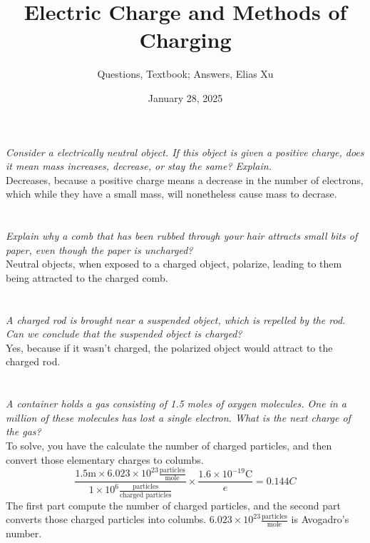 \documentclass{article}
\begin{document}
\title{Electric Charge and Methods of Charging}
\author{Questions, Textbook; Answers, Elias Xu}
\date{January 28, 2025}
\maketitle


\section{}
\emph{Consider a electrically neutral object. If this object is given a positive charge, does it mean mass increases, decrease, or stay the same? Explain.} \\
Decreases, because a positive charge means a decrease in the number of electrons, which while they have a small mass, will nonetheless cause mass to decrase.

\section{}
\emph{Explain why a comb that has been rubbed through your hair attracts small bits of paper, even though the paper is uncharged?} \\
Neutral objects, when exposed to a charged object, polarize, leading to them being attracted to the charged comb.

\section{}
\emph{A charged rod is brought near a suspended object, which is repelled by the rod. Can we conclude that the suspended object is charged?} \\
Yes, because if it wasn't charged, the polarized object would attract to the charged rod.

\section{}
\emph{A container holds a gas consisting of 1.5 moles of oxygen molecules. One in a million of these molecules has lost a single electron. What is the next charge of the gas?} \\
To solve, you have the calculate the number of charged particles, and then convert those elementary charges to columbs.
$$\frac{1.5 \text {m} \times 6.023 \times 10 ^ {23} \frac{\text{particles}}{\text{mole}}}{1 \times 10 ^ 6 \frac{\text {particles}}{\text{charged particles} }} \times \frac{1.6 \times 10 ^ {-19} \text{C}}{e} = \boxed{ 0.144 C}$$
The first part compute the number of charged particles, and the second part converts those charged particles into columbs. $6.023 \times 10 ^ {23} \frac{\text{particles}}{\text{mole}}$ is Avogadro's number.
\end{document}
